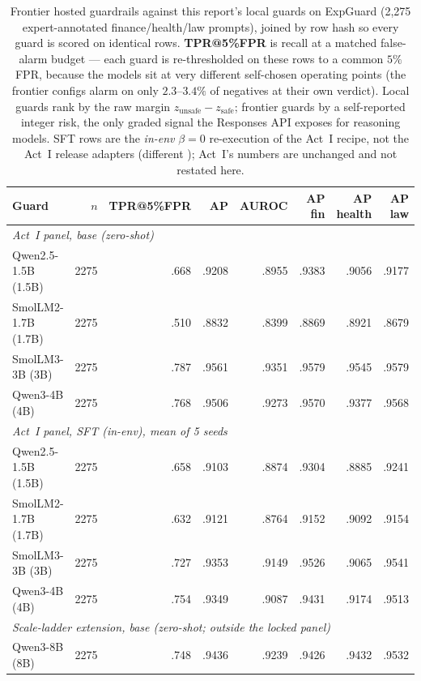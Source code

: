 \begin{table}[H]\centering\footnotesize
\caption{Frontier hosted guardrails against this report's local guards on ExpGuard (2,275 expert-annotated finance/health/law prompts), joined by row hash so every guard is scored on identical rows. \textbf{TPR@5\%FPR} is recall at a matched false-alarm budget --- each guard is re-thresholded on these rows to a common $5\%$ FPR, because the models sit at very different self-chosen operating points (the frontier configs alarm on only $2.3$--$3.4\%$ of negatives at their own verdict). Local guards rank by the raw margin $z_{\text{unsafe}}-z_{\text{safe}}$; frontier guards by a self-reported integer risk, the only graded signal the Responses API exposes for reasoning models. SFT rows are the \emph{in-env} $\beta{=}0$ re-execution of the Act~I recipe, not the Act~I release adapters (different ); Act~I's numbers are unchanged and not restated here.}
\label{tab:frontier}
\begin{tabular}{lrrrrrrr}\toprule
Guard & $n$ & TPR@5\%FPR & AP & AUROC & AP fin & AP health & AP law \\
\midrule
\multicolumn{8}{l}{\emph{Act~I panel, base (zero-shot)}} \\
Qwen2.5-1.5B (1.5B) & 2275 & .668 & .9208 & .8955 & .9383 & .9056 & .9177 \\
SmolLM2-1.7B (1.7B) & 2275 & .510 & .8832 & .8399 & .8869 & .8921 & .8679 \\
SmolLM3-3B (3B) & 2275 & .787 & .9561 & .9351 & .9579 & .9545 & .9579 \\
Qwen3-4B (4B) & 2275 & .768 & .9506 & .9273 & .9570 & .9377 & .9568 \\
\midrule
\multicolumn{8}{l}{\emph{Act~I panel, SFT (in-env), mean of 5 seeds}} \\
Qwen2.5-1.5B (1.5B) & 2275 & .658 & .9103 & .8874 & .9304 & .8885 & .9241 \\
SmolLM2-1.7B (1.7B) & 2275 & .632 & .9121 & .8764 & .9152 & .9092 & .9154 \\
SmolLM3-3B (3B) & 2275 & .727 & .9353 & .9149 & .9526 & .9065 & .9541 \\
Qwen3-4B (4B) & 2275 & .754 & .9349 & .9087 & .9431 & .9174 & .9513 \\
\midrule
\multicolumn{8}{l}{\emph{Scale-ladder extension, base (zero-shot; outside the locked panel)}} \\
Qwen3-8B (8B) & 2275 & .748 & .9436 & .9239 & .9426 & .9432 & .9532 \\

\end{tabular}
\end{table}

